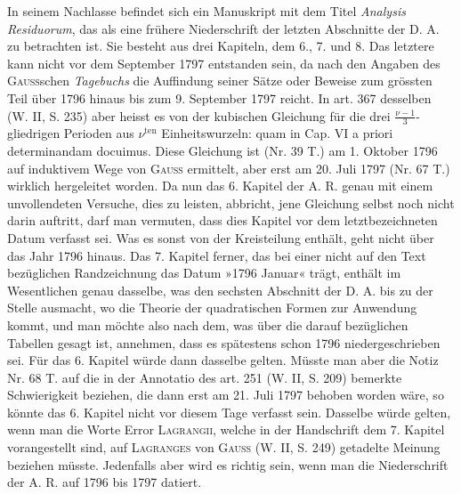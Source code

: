 In seinem Nachlasse befindet sich ein Manuskript mit dem Titel \textit{Analysis Residuorum}, das als eine frühere Niederschrift der letzten Abschnitte der D. A. zu betrachten ist. Sie besteht aus drei Kapiteln, dem 6., 7. und 8. Das letztere kann nicht vor dem September 1797 entstanden sein, da nach den Angaben des \textsc{Gauss}schen \textit{Tagebuchs} die Auffindung seiner Sätze oder Beweise zum grössten Teil über 1796 hinaus bis zum 9. September 1797 reicht. In art. 367 desselben (W. II, S. 235) aber heisst es von der kubischen Gleichung für die drei \(\frac{\nu-1}{3}\)-gliedrigen Perioden aus \(\nu^{\mathrm{ten}}\) Einheitswurzeln: quam in Cap. VI a priori determinandam docuimus. Diese Gleichung ist (Nr. 39 T.) am 1. Oktober 1796 auf induktivem Wege von \textsc{Gauss} ermittelt, aber erst am 20. Juli 1797 (Nr. 67 T.) wirklich hergeleitet worden. Da nun das 6. Kapitel der A. R. genau mit einem unvollendeten Versuche, dies zu leisten, abbricht, jene Gleichung selbst noch nicht darin auftritt, darf man vermuten, dass dies Kapitel vor dem letztbezeichneten Datum verfasst sei. Was es sonst von der Kreisteilung enthält, geht nicht über das Jahr 1796 hinaus. Das 7. Kapitel ferner, das bei einer nicht auf den Text bezüglichen Randzeichnung das Datum »1796 Januar« trägt, enthält im Wesentlichen genau dasselbe, was den sechsten Abschnitt der D. A. bis zu der Stelle ausmacht, wo die Theorie der quadratischen Formen zur Anwendung kommt, und man möchte also nach dem, was über die darauf bezüglichen Tabellen gesagt ist, annehmen, dass es spätestens schon 1796 niedergeschrieben sei. Für das 6. Kapitel würde dann dasselbe gelten. Müsste man aber die Notiz Nr. 68 T. auf die in der Annotatio des art. 251 (W. II, S. 209) bemerkte Schwierigkeit beziehen, die dann erst am 21. Juli 1797 behoben worden wäre, so könnte das 6. Kapitel nicht vor diesem Tage verfasst sein. Dasselbe würde gelten, wenn man die Worte Error \textsc{Lagrangii}, welche in der Handschrift dem 7. Kapitel vorangestellt sind, auf \textsc{Lagranges} von \textsc{Gauss} (W. II, S. 249) getadelte Meinung beziehen müsste. Jedenfalls aber wird es richtig sein, wenn man die Niederschrift der A. R. auf 1796 bis 1797 datiert.
\clearpage{}
